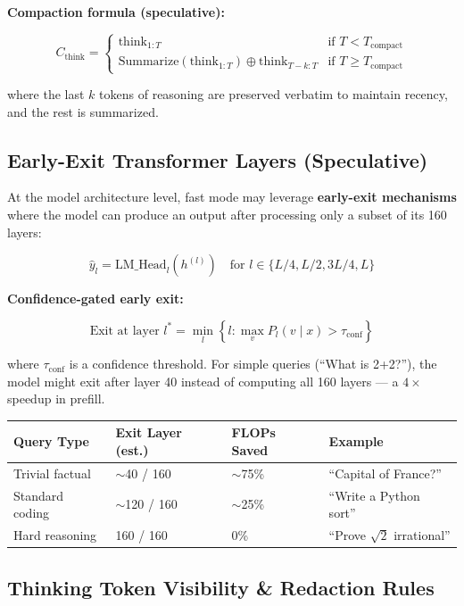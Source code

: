 \documentclass[11pt,a4paper]{article}
\begin{document}
\textbf{Compaction formula (speculative):}

$$C_{\text{think}} = \begin{cases}
\text{think}_{1:T} & \text{if } T < T_{\text{compact}} \\
\text{Summarize}(\text{think}_{1:T}) \oplus \text{think}_{T-k:T} & \text{if } T \geq T_{\text{compact}}
\end{cases}$$

where the last $k$ tokens of reasoning are preserved verbatim to maintain recency, and the rest is summarized.

\subsection{Early-Exit Transformer Layers (Speculative)}

At the model architecture level, fast mode may leverage \textbf{early-exit mechanisms} where the model can produce an output after processing only a subset of its 160 layers:

$$\hat{y}_l = \text{LM\_Head}_l(h^{(l)}) \quad \text{for } l \in \{L/4, L/2, 3L/4, L\}$$

\textbf{Confidence-gated early exit:}

$$\text{Exit at layer } l^* = \min_l \left\{ l : \max_v P_l(v \mid x) > \tau_{\text{conf}} \right\}$$

where $\tau_{\text{conf}}$ is a confidence threshold. For simple queries (``What is 2+2?''), the model might exit after layer 40 instead of computing all 160 layers --- a $4\times$ speedup in prefill.

\begin{center}
\begin{tabular}{llll}
\toprule
\textbf{Query Type} & \textbf{Exit Layer (est.)} & \textbf{FLOPs Saved} & \textbf{Example} \\
\midrule
Trivial factual & $\sim$40 / 160 & $\sim$75\% & ``Capital of France?'' \\
Standard coding & $\sim$120 / 160 & $\sim$25\% & ``Write a Python sort'' \\
Hard reasoning & 160 / 160 & 0\% & ``Prove $\sqrt{2}$ irrational'' \\
\bottomrule
\end{tabular}
\end{center}

\subsection{Thinking Token Visibility \& Redaction Rules}
\end{document}
